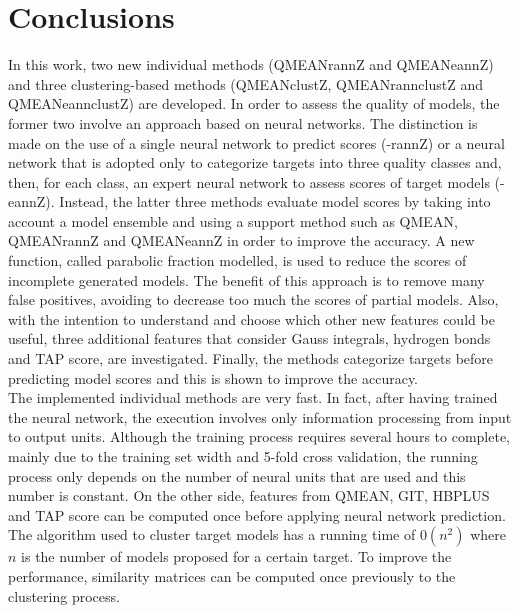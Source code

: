 
\chapter{Conclusions}
\label{conclusions}
In this work, two new individual methods (QMEAN\-rannZ and QMEAN\-eannZ) and three clustering-based methods (QMEAN\-clustZ, QMEAN\-rann\-clustZ and QMEAN\-eann\-clustZ) are developed. In order to assess the quality of models, the former two involve an approach based on neural networks. The distinction is made on the use of a single neural network to predict scores (-rannZ) or a neural network that is adopted only to categorize targets into three quality classes and, then, for each class, an expert neural network to assess scores of target models (-eannZ). Instead, the latter three methods evaluate model scores by taking into account a model ensemble and using a support method such as QMEAN, QMEAN\-rannZ and QMEAN\-eannZ in order to improve the accuracy. A new function, called parabolic fraction modelled, is used to reduce the scores of incomplete generated models. The benefit of this approach is to remove many false positives, avoiding to decrease too much the scores of partial models. Also, with the intention to understand and choose which other new features could be useful, three additional features that consider Gauss integrals, hydrogen bonds and TAP score, are investigated. Finally, the methods categorize targets before predicting model scores and this is shown to improve the accuracy. \\
The implemented individual methods are very fast. In fact, after having trained the neural network, the execution involves only information processing from input to output units. Although the training process requires several hours to complete, mainly due to the training set width and 5-fold cross validation, the running process only depends on the number of neural units that are used and this number is constant. On the other side, features from QMEAN, GIT, HBPLUS and TAP score can be computed once before applying neural network prediction. The algorithm used to cluster target models has a running time of $0(n^{2})$ where $n$ is the number of models proposed for a certain target. To improve the performance, similarity matrices can be computed once previously to the clustering process. \\
